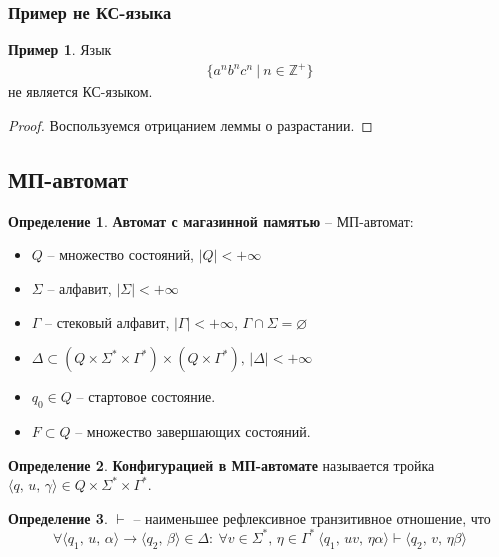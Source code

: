 \documentclass[a4paper,12pt]{article}
\renewcommand{\emptyset}{\ensuremath{\varnothing}}
\theoremstyle{plain}
\theoremstyle{definition}
\newtheorem{definition}{Определение}[subsection]
\newtheorem*{example}{Пример}
\theoremstyle{remark}
\begin{document}
\subsubsection*{Пример не КС-языка}
\begin{example}
	Язык
	\begin{align*}
		\{a^nb^nc^n \:|\: n \in \mathbb{Z}^+\}
	\end{align*}
	не является КС-языком.
\end{example}

\begin{proof}
	Воспользуемся отрицанием леммы о разрастании.
\end{proof}

\subsection{МП-автомат}
\begin{definition}
	\textbf{Автомат с магазинной памятью} -- МП-автомат:
	\begin{itemize}
		\item $Q$ -- множество состояний, $\vert Q\vert < +\infty$
		\item $\Sigma$ -- алфавит, $\vert \Sigma\vert < +\infty$
		\item $\Gamma$ -- стековый алфавит, $\vert \Gamma\vert < +\infty,\, \Gamma \cap \Sigma = \emptyset$
		\item $\Delta \subset (Q \times \Sigma^* \times \Gamma^*) \times (Q \times \Gamma^*),\, \vert \Delta\vert < +\infty$
		\item $q_0 \in Q$ -- стартовое состояние.
		\item $F \subset Q$ -- множество завершающих состояний.
	\end{itemize}
\end{definition}

\begin{definition}
	\textbf{Конфигурацией в МП-автомате} называется тройка $\langle q,\, u,\, \gamma\rangle \in Q \times \Sigma^* \times \Gamma^*$.
\end{definition}

\begin{definition}
	$\vdash$ -- наименьшее рефлексивное транзитивное отношение, что
	\[
		\forall\langle q_1,\,u,\,\alpha\rangle \to \langle q_2,\, \beta\rangle \in \Delta :\: \forall v \in \Sigma^*,\, \eta \in \Gamma^* \: \langle q_1,\, uv,\, \eta\alpha\rangle \vdash \langle q_2,\, v,\, \eta\beta\rangle
	\]
\end{definition}
\end{document}
